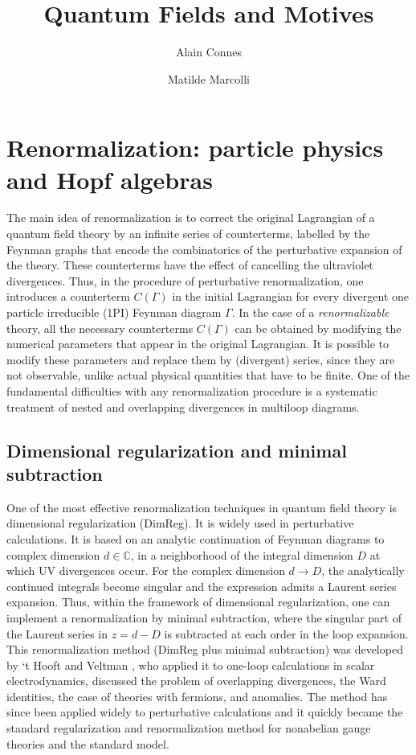 \documentclass[10pt]{amsart}
\title{Quantum Fields and Motives}
\author{Alain Connes}
\author{Matilde Marcolli}
\date{}
\def\C{{\mathbb C}}
\def\G{\Gamma}
\numberwithin{equation}{section}
\begin{document}
\maketitle


\section{Renormalization: particle physics and Hopf algebras}

The main idea of renormalization is to correct the original
Lagrangian of a quantum field theory by an infinite series of
counterterms, labelled by the Feynman graphs that encode the
combinatorics of the perturbative expansion of the theory. These
counterterms have the effect of cancelling the ultraviolet
divergences. Thus, in the procedure of perturbative
renormalization, one introduces a counterterm $C(\G)$ in the
initial Lagrangian for every divergent one particle irreducible
(1PI) Feynman diagram $\Gamma$. In the case of a {\em
renormalizable} theory, all the necessary counterterms $C(\G)$ can
be obtained by modifying the numerical parameters that appear in
the original Lagrangian. It is possible to modify these parameters
and replace them by (divergent) series, since they are not
observable, unlike actual physical quantities that have to be
finite. One of the fundamental difficulties with any
renormalization procedure is a systematic treatment of nested and
overlapping divergences in multiloop diagrams.

\medskip
\subsection*{Dimensional regularization and minimal
subtraction}\hfill\medskip

One of the most effective renormalization techniques in quantum field
theory is dimensional regularization (DimReg). It is widely used in
perturbative calculations. It is based on an analytic continuation of
Feynman diagrams to complex dimension $d\in \C$, in a neighborhood of
the integral dimension $D$ at which UV divergences occur. For the
complex dimension $d\to D$, the analytically continued integrals
become singular and the expression admits a Laurent series
expansion. Thus, within the framework of dimensional regularization,
one can implement a renormalization by minimal subtraction, where the
singular part of the Laurent series in $z=d-D$ is subtracted at each
order in the loop expansion. This renormalization method (DimReg plus
minimal subtraction) was developed by `t Hooft and Veltman \cite{tHV},
who applied it to one-loop calculations in scalar electrodynamics,
discussed the problem of overlapping divergences, the Ward identities,
the case of theories with fermions, and anomalies.  The method has
since been applied widely to perturbative calculations and it quickly
became the standard regularization and renormalization method for
nonabelian gauge theories and the standard model.
\end{document}
